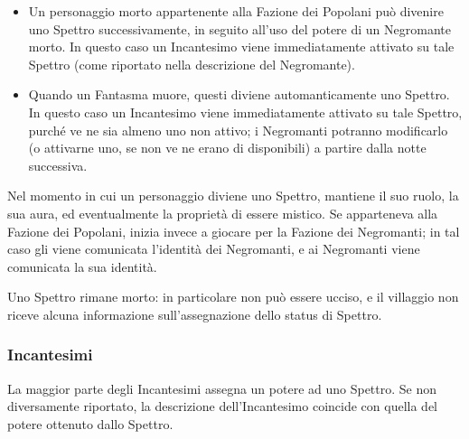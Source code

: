 \documentclass[a4paper,10pt]{article}
\begin{document}
\begin{itemize}
\begin{itemize}
		\item Un personaggio morto appartenente alla Fazione dei Popolani può divenire uno Spettro successivamente, in seguito all'uso del potere di un Negromante morto. In questo caso un Incantesimo viene immediatamente attivato su tale Spettro (come riportato nella descrizione del Negromante).
		
		\item Quando un Fantasma muore, questi diviene automanticamente uno Spettro. In questo caso un Incantesimo viene immediatamente attivato su tale Spettro, purché ve ne sia almeno uno non attivo; i Negromanti potranno modificarlo (o attivarne uno, se non ve ne erano di disponibili) a partire dalla notte successiva.
	\end{itemize}
 	
 	Nel momento in cui un personaggio diviene uno Spettro, mantiene il suo ruolo, la sua aura, ed eventualmente la proprietà di essere mistico. Se apparteneva alla Fazione dei Popolani, inizia invece a giocare per la Fazione dei Negromanti; in tal caso gli viene comunicata l'identità dei Negromanti, e ai Negromanti viene comunicata la sua identità.
 	
	Uno Spettro rimane morto: in particolare non può essere ucciso, e il villaggio non riceve alcuna informazione sull'assegnazione dello status di Spettro.
 
\end{itemize}


\subsubsection*{Incantesimi}

La maggior parte degli Incantesimi assegna un potere ad uno Spettro. Se non diversamente riportato, la descrizione dell'Incantesimo coincide con quella del potere ottenuto dallo Spettro.
\end{document}
